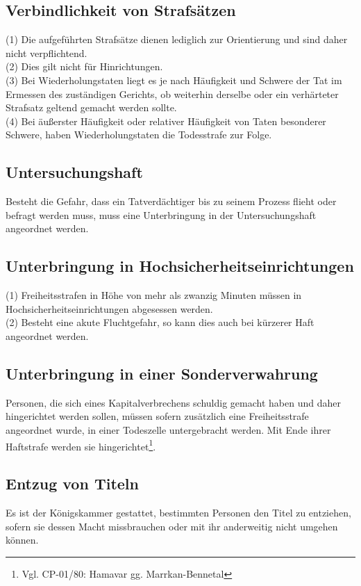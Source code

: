 \documentclass{article}
\begin{document}
\subsection{Verbindlichkeit von Strafsätzen}
(1) Die aufgeführten Strafsätze dienen lediglich zur Orientierung und sind daher nicht verpflichtend.\\
(2) Dies gilt nicht für Hinrichtungen.\\
(3) Bei Wiederholungstaten liegt es je nach Häufigkeit und Schwere der Tat im Ermessen des zuständigen Gerichts, ob weiterhin derselbe oder ein verhärteter Strafsatz geltend gemacht werden sollte.\\
(4) Bei äußerster Häufigkeit oder relativer Häufigkeit von Taten besonderer Schwere, haben Wiederholungstaten die Todesstrafe zur Folge.

\subsection{Untersuchungshaft}
Besteht die Gefahr, dass ein Tatverdächtiger bis zu seinem Prozess flieht oder befragt werden muss, muss eine Unterbringung in der Untersuchungshaft angeordnet werden.\\

\subsection{Unterbringung in Hochsicherheitseinrichtungen}
(1)	Freiheitsstrafen in Höhe von mehr als zwanzig Minuten müssen in Hochsicherheitseinrichtungen abgesessen werden.\\
(2)	Besteht eine akute Fluchtgefahr, so kann dies auch bei kürzerer Haft angeordnet werden.

\subsection{Unterbringung in einer Sonderverwahrung}
Personen, die sich eines Kapitalverbrechens schuldig gemacht haben und daher hingerichtet werden sollen, müssen sofern zusätzlich eine Freiheitsstrafe angeordnet wurde, in einer Todeszelle untergebracht werden. Mit Ende ihrer Haftstrafe werden sie hingerichtet\footnote{Vgl. CP-01/80: Hamavar gg. Marrkan-Bennetal}.

\subsection{Entzug von Titeln}
Es ist der Königskammer gestattet, bestimmten Personen den Titel zu entziehen, sofern sie dessen Macht missbrauchen oder mit ihr anderweitig nicht umgehen können.
\end{document}
